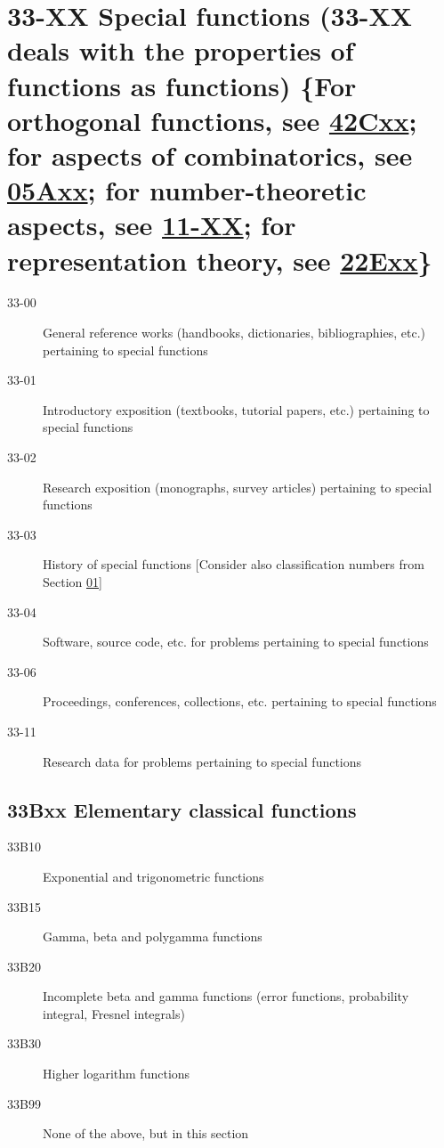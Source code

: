 \documentclass[letterpaper]{article}
\begin{document}
\section*{33-XX Special functions (33-XX deals with the properties of functions as functions) \{For orthogonal functions, see \hyperref[42Cxx]{42Cxx}; for aspects of combinatorics, see \hyperref[05Axx]{05Axx}; for number-theoretic aspects, see \hyperref[11-XX]{11-XX}; for representation theory, see \hyperref[22Exx]{22Exx}\} }\label{33-XX}
\begin{description}
\item [33-00]\label{33-00} General reference works (handbooks, dictionaries, bibliographies, etc.) pertaining to special functions
\item [33-01]\label{33-01} Introductory exposition (textbooks, tutorial papers, etc.) pertaining to special functions
\item [33-02]\label{33-02} Research exposition (monographs, survey articles) pertaining to special functions
\item [33-03]\label{33-03} History of special functions [Consider also classification numbers from Section \hyperref[01-XX]{01}]
\item [33-04]\label{33-04} Software, source code, etc. for problems pertaining to special functions
\item [33-06]\label{33-06} Proceedings, conferences, collections, etc. pertaining to special functions
\item [33-11]\label{33-11} Research data for problems pertaining to special functions
\end{description}
\subsection*{33Bxx  Elementary classical functions }\label{33Bxx}
\begin{description}  
\item [33B10]\label{33B10} Exponential and trigonometric functions
\item [33B15]\label{33B15} Gamma, beta and polygamma functions
\item [33B20]\label{33B20} Incomplete beta and gamma functions (error functions, probability integral, Fresnel integrals)
\item [33B30]\label{33B30} Higher logarithm functions
\item [33B99]\label{33B99} None of the above, but in this section
\end{description}
\end{document}
